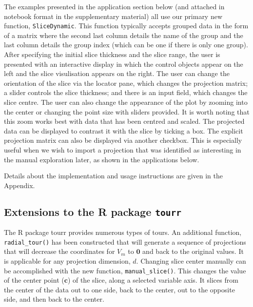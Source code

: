 \documentclass[]{interact}
\theoremstyle{plain}%
\theoremstyle{definition}
\theoremstyle{remark}
\begin{document}
The examples presented in the application section below (and attached in
notebook format in the supplementary material) all use our primary new
function, \texttt{SliceDynamic}. This function typically accepts grouped
data in the form of a matrix where the second last column details the
name of the group and the last column details the group index (which can
be one if there is only one group). After specifying the initial slice
thickness and the slice range, the user is presented with an interactive
display in which the control objects appear on the left and the slice
visulisation appears on the right. The user can change the orientation
of the slice via the locator pane, which changes the projection matrix;
a slider controls the slice thickness; and there is an input field,
which changes the slice centre. The user can also change the appearance
of the plot by zooming into the center or changing the point size with
sliders provided. It is worth noting that this zoom works best with data
that has been centred and scaled. The projected data can be displayed to
contrast it with the slice by ticking a box. The explicit projection
matrix can also be displayed via another checkbox. This is especially
useful when we wish to import a projection that was identified as
interesting in the manual exploration later, as shown in the
applications below.

Details about the implementation and usage instructions are given in the
Appendix.

\hypertarget{extensions-to-the-r-package-tourr}{%
\subsection{\texorpdfstring{Extensions to the R package
\texttt{tourr}}{Extensions to the R package tourr}}\label{extensions-to-the-r-package-tourr}}

The R package tourr \citep{tourr} provides numerous types of tours. An
additional function, \texttt{radial\_tour()} has been constructed that
will generate a sequence of projections that will decrease the
coordinates for \(V_m\) to \(\boldsymbol{0}\) and back to the original
values. It is applicable for any projection dimension, \(d\). Changing
slice center manually can be accomplished with the new function,
\texttt{manual\_slice()}. This changes the value of the center point
(\(\mathbf{c}\)) of the slice, along a selected variable axis. It slices
from the center of the data out to one side, back to the center, out to
the opposite side, and then back to the center.
\end{document}
